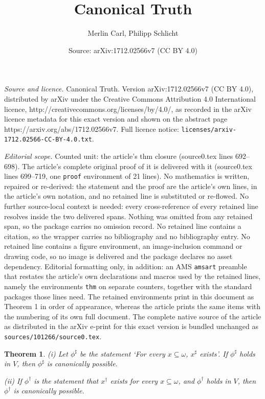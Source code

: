 \documentclass[10pt,a4paper]{amsart}
\title{Canonical Truth}
\author{Merlin Carl, Philipp Schlicht}
\date{Source: arXiv:1712.02566v7 (CC BY 4.0)}
\newtheorem{thm}{Theorem}
\begin{document}
\maketitle

\noindent\emph{Source and licence.} Canonical Truth. Version arXiv:1712.02566v7 (CC BY 4.0), distributed by arXiv under the Creative Commons Attribution 4.0 International licence, http://creativecommons.org/licenses/by/4.0/, as recorded in the arXiv licence metadata for this exact version and shown on the abstract page https://arxiv.org/abs/1712.02566v7. Full licence notice: \texttt{licenses/arxiv-1712.02566-CC-BY-4.0.txt}.\par\smallskip

\noindent\textit{Editorial scope.} Counted unit: the article's thm closure (source0.tex lines 692--698). The article's complete original proof of it is delivered with it (source0.tex lines 699--719, one \texttt{proof} environment of 21 lines). No mathematics is written, repaired or re-derived: the statement and the proof are the article's own lines, in the article's own notation, and no retained line is substituted or re-flowed.  No further source-local context is needed: every cross-reference of every retained line resolves inside the two delivered spans.  Nothing was omitted from any retained span, so the package carries no omission record.  No retained line contains a citation, so the wrapper carries no bibliography and no bibliography entry.  No retained line contains a figure environment, an image-inclusion command or drawing code, so no image is delivered and the package declares no asset dependency.  Editorial formatting only, in addition: an AMS \texttt{amsart} preamble that restates the article's own declarations and macros used by the retained lines, namely the environments \texttt{thm} on separate counters, together with the standard packages those lines need.  The retained environments print in this document as Theorem 1 in order of appearance, whereas the article prints the same items with the numbering of its own full document.  The complete native source of the article as distributed in the arXiv e-print for this exact version is bundled unchanged as \texttt{sources/101266/source0.tex}.
\begin{thm}{\label{sharp closure}}
(i) Let $\phi^{\sharp}$ be the statement `For every $x\subseteq\omega$, $x^{\sharp}$ exists'.
If $\phi^{\sharp}$ holds in $V$, then $\phi^{\sharp}$ is canonically possible.

(ii) If $\phi^{\dagger}$ is the statement that $x^{\dagger}$ exists for  every $x\subseteq\omega$,
and $\phi^{\dagger}$ holds in $V$, then $\phi^{\dagger}$ is canonically possible.
\end{thm}
\end{document}
